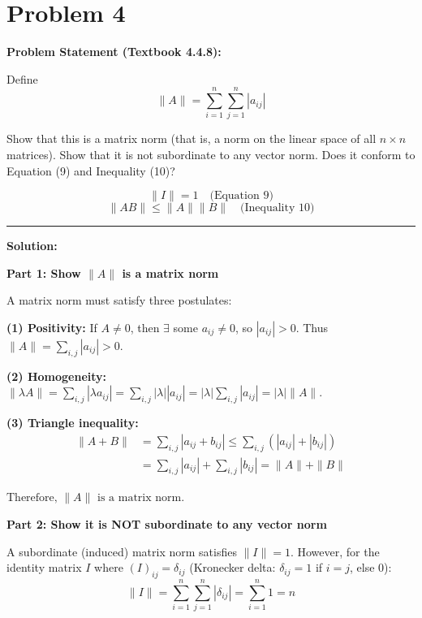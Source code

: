 \clearpage
\section*{Problem 4}

\textbf{Problem Statement (Textbook 4.4.8):} 

Define
$$\|A\| = \sum_{i=1}^{n} \sum_{j=1}^{n} |a_{ij}|$$

Show that this is a matrix norm (that is, a norm on the linear space of all $n \times n$ matrices). Show that it is not subordinate to any vector norm. Does it conform to Equation (9) and Inequality (10)?

$$\|I\| = 1 \quad \text{(Equation 9)}$$
$$\|AB\| \leq \|A\|\|B\| \quad \text{(Inequality 10)}$$

\noindent\rule{\textwidth}{0.4pt}

\vspace{1em}

\textbf{Solution:}

\textbf{Part 1: Show $\|A\|$ is a matrix norm}

A matrix norm must satisfy three postulates:

\textbf{(1) Positivity:} If $A \neq 0$, then $\exists$ some $a_{ij} \neq 0$, so $|a_{ij}| > 0$. Thus $\|A\| = \sum_{i,j} |a_{ij}| > 0$.

\textbf{(2) Homogeneity:} $\|\lambda A\| = \sum_{i,j} |\lambda a_{ij}| = \sum_{i,j} |\lambda| |a_{ij}| = |\lambda| \sum_{i,j} |a_{ij}| = |\lambda| \|A\|$.

\textbf{(3) Triangle inequality:} 
\begin{align*}
\|A + B\| &= \sum_{i,j} |a_{ij} + b_{ij}| \leq \sum_{i,j} (|a_{ij}| + |b_{ij}|) \\
&= \sum_{i,j} |a_{ij}| + \sum_{i,j} |b_{ij}| = \|A\| + \|B\|
\end{align*}

$\boxed{\text{Therefore, } \|A\| \text{ is a matrix norm.}}$

\vspace{0.5em}

\textbf{Part 2: Show it is NOT subordinate to any vector norm}

A subordinate (induced) matrix norm satisfies $\|I\| = 1$. However, for the identity matrix $I$ where $(I)_{ij} = \delta_{ij}$ (Kronecker delta: $\delta_{ij} = 1$ if $i = j$, else $0$):
$$\|I\| = \sum_{i=1}^{n} \sum_{j=1}^{n} |\delta_{ij}| = \sum_{i=1}^{n} 1 = n$$


